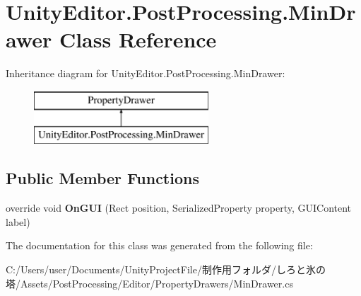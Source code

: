 \hypertarget{class_unity_editor_1_1_post_processing_1_1_min_drawer}{}\section{Unity\+Editor.\+Post\+Processing.\+Min\+Drawer Class Reference}
\label{class_unity_editor_1_1_post_processing_1_1_min_drawer}
Inheritance diagram for Unity\+Editor.\+Post\+Processing.\+Min\+Drawer\+:\begin{figure}[H]
\begin{center}
\leavevmode
\includegraphics[height=2.000000cm]{class_unity_editor_1_1_post_processing_1_1_min_drawer}
\end{center}
\end{figure}
\subsection*{Public Member Functions}
\begin{DoxyCompactItemize}
\item 
\mbox{\label{class_unity_editor_1_1_post_processing_1_1_min_drawer_ad2ca5ec821cabdc3ca03f592c3404949}} 
override void {\bfseries On\+G\+UI} (Rect position, Serialized\+Property property, G\+U\+I\+Content label)
\end{DoxyCompactItemize}


The documentation for this class was generated from the following file\+:\begin{DoxyCompactItemize}
\item 
C\+:/\+Users/user/\+Documents/\+Unity\+Project\+File/制作用フォルダ/しろと氷の塔/\+Assets/\+Post\+Processing/\+Editor/\+Property\+Drawers/Min\+Drawer.\+cs\end{DoxyCompactItemize}
